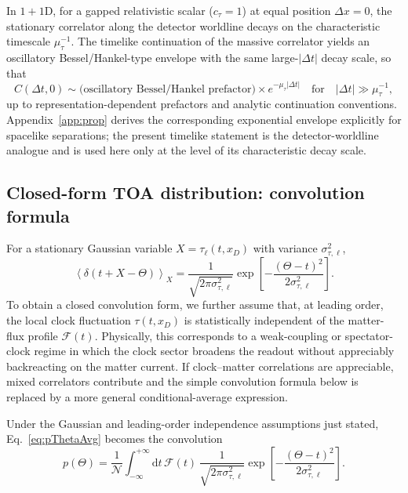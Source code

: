 \documentclass[pdflatex,sn-mathphys-num]{sn-jnl}
\theoremstyle{thmstylethree}
\theoremstyle{thmstyleone}
\theoremstyle{thmstyletwo}
\numberwithin{equation}{section}
\newcommand{\dd}{\mathrm{d}}
\newcommand{\F}{\mathcal{F}}
\begin{document}
        In $1+1$D, for a gapped relativistic scalar ($c_\tau=1$) at equal position $\Delta x=0$, the stationary correlator along the detector worldline decays on the characteristic timescale $\mu_\tau^{-1}$. The timelike continuation of the massive correlator yields an oscillatory Bessel/Hankel-type envelope with the same large-$|\Delta t|$ decay scale, so that
        \begin{equation}
            C(\Delta t,0)\sim \text{(oscillatory Bessel/Hankel prefactor)}\times e^{-\mu_\tau |\Delta t|}
            \quad\text{for}\quad |\Delta t|\gg \mu_\tau^{-1},
            \label{eq:Cexp}
        \end{equation}
        up to representation-dependent prefactors and analytic continuation conventions. Appendix~\ref{app:prop} derives the corresponding exponential envelope explicitly for spacelike separations; the present timelike statement is the detector-worldline analogue and is used here only at the level of its characteristic decay scale.
    
    \subsection{Closed-form TOA distribution: convolution formula}
        
        For a stationary Gaussian variable $X=\tau_\ell(t,x_D)$ with variance $\sigma_{\tau,\ell}^2$,
        \begin{equation}
            \left\langle \delta(t+X-\Theta)\right\rangle_X
            =\frac{1}{\sqrt{2\pi\sigma_{\tau,\ell}^2}}
            \exp\!\left[-\frac{(\Theta-t)^2}{2\sigma_{\tau,\ell}^2}\right].
        \end{equation}
        To obtain a closed convolution form, we further assume that, at leading order, the local clock fluctuation $\tau(t,x_D)$ is statistically independent of the matter-flux profile $\mathcal{F}(t)$. Physically, this corresponds to a weak-coupling or spectator-clock regime in which the clock sector broadens the readout without appreciably backreacting on the matter current. If clock--matter correlations are appreciable, mixed correlators contribute and the simple convolution formula below is replaced by a more general conditional-average expression.
        
        Under the Gaussian and leading-order independence assumptions just stated, Eq.~\eqref{eq:pThetaAvg} becomes the convolution
        \begin{equation}
            p(\Theta)=\frac{1}{\mathcal{N}}
            \int_{-\infty}^{+\infty}\dd t\,
            \F(t)\,
            \frac{1}{\sqrt{2\pi\sigma_{\tau,\ell}^2}}
            \exp\!\left[-\frac{(\Theta-t)^2}{2\sigma_{\tau,\ell}^2}\right].
            \label{eq:convolution}
        \end{equation}
        
\end{document}
